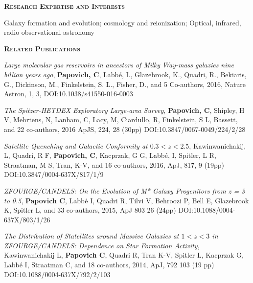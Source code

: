 \documentclass[11pt]{article}
\begin{document}
\begin{flushleft}
\vspace{-0.1in}
{\large {\bf \textsc{Research Expertise and Interests}}
\hrulefill}
\end{flushleft}

Galaxy formation and evolution;  cosmology and reionization;
Optical, infrared, radio observational astronomy

\begin{flushleft}
\vspace{-0.1in}
{\large {\bf \textsc{Related Publications}}
\hrulefill}
\end{flushleft}

\vspace{-0.07in} 

\hangindent=1.5cm   {\it Large molecular gas reservoirs in
  ancestors of Milky Way-mass galaxies nine billion years ago},  {\bf
  Papovich, C}, Labb\'e, I., Glazebrook, K., Quadri, R., Bekiaris, G.,
Dickinson, M., Finkelstein, S. L., Fisher, D., and 5 Co-authors, 2016,
Nature Astron, 1, 3, DOI:10.1038/s41550-016-0003

\hangindent=1.5cm   {\it The
Spitzer-HETDEX  Exploratory Large-area Survey}, {\bf Papovich, C},
Shipley, H V, Mehrtens, N, Lanham, C, Lacy, M, Ciardullo, R,
Finkelstein, S L, Bassett, and 22 co-authors, 2016 ApJS, 224, 28
(30pp) DOI:10.3847/0067-0049/224/2/28

\hangindent=1.5cm  
{\it Satellite Quenching and
  Galactic Conformity at $0.3 < z < 2.5$}, Kawinwanichakij, L, Quadri, R F, \textbf{Papovich,
  C}, Kacprzak, G G, Labb\'e, I, Spitler, L R, Straatman,
 M S, Tran, K-V, and 16 co-authors, 2016, ApJ, 817, 9 (19pp)
DOI:10.3847/0004-637X/817/1/9

\hangindent=1.5cm  
{\it ZFOURGE/CANDELS: On the Evolution of M*
  Galaxy Progenitors from z = 3 to 0.5}, 
\textbf{Papovich C}, Labb\'e I, Quadri R, Tilvi V, Behroozi P, Bell 
E, Glazebrook K, Spitler L, and 33 co-authors,  2015, ApJ 803 26 (24pp)
DOI:10.1088/0004-637X/803/1/26

\hangindent=1.5cm  
{\it The Distribution of Statellites around Massive Galaxies at $1 < z
< 3$ in ZFOURGE/CANDELS: Dependence on Star Formation Activity},
Kawinwanichakij L, \textbf{Papovich C}, Quadri R, Tran K-V, Spitler L,
Kacprzak G, Labb\'e I, Straatman C, and 18 co-authors, 2014, ApJ, 792
103 (19 pp) DOI:10.1088/0004-637X/792/2/103
\end{document}
